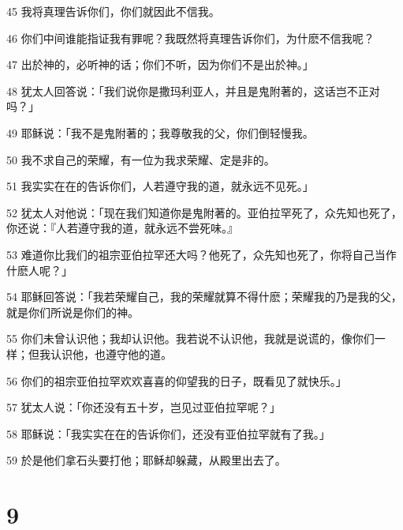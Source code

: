 \par 45 我将真理告诉你们，你们就因此不信我。
\par 46 你们中间谁能指证我有罪呢？我既然将真理告诉你们，为什麽不信我呢？
\par 47 出於神的，必听神的话；你们不听，因为你们不是出於神。」
\par 48 犹太人回答说：「我们说你是撒玛利亚人，并且是鬼附著的，这话岂不正对吗？」
\par 49 耶稣说：「我不是鬼附著的；我尊敬我的父，你们倒轻慢我。
\par 50 我不求自己的荣耀，有一位为我求荣耀、定是非的。
\par 51 我实实在在的告诉你们，人若遵守我的道，就永远不见死。」
\par 52 犹太人对他说：「现在我们知道你是鬼附著的。亚伯拉罕死了，众先知也死了，你还说：『人若遵守我的道，就永远不尝死味。』
\par 53 难道你比我们的祖宗亚伯拉罕还大吗？他死了，众先知也死了，你将自己当作什麽人呢？」
\par 54 耶稣回答说：「我若荣耀自己，我的荣耀就算不得什麽；荣耀我的乃是我的父，就是你们所说是你们的神。
\par 55 你们未曾认识他；我却认识他。我若说不认识他，我就是说谎的，像你们一样；但我认识他，也遵守他的道。
\par 56 你们的祖宗亚伯拉罕欢欢喜喜的仰望我的日子，既看见了就快乐。」
\par 57 犹太人说：「你还没有五十岁，岂见过亚伯拉罕呢？」
\par 58 耶稣说：「我实实在在的告诉你们，还没有亚伯拉罕就有了我。」
\par 59 於是他们拿石头要打他；耶稣却躲藏，从殿里出去了。

\chapter{9}

